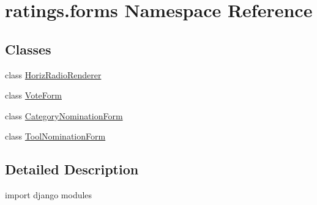 \hypertarget{namespaceratings_1_1forms}{\section{ratings.\-forms Namespace Reference}
\label{namespaceratings_1_1forms}
}
\subsection*{Classes}
\begin{DoxyCompactItemize}
\item 
class \hyperlink{classratings_1_1forms_1_1HorizRadioRenderer}{Horiz\-Radio\-Renderer}
\item 
class \hyperlink{classratings_1_1forms_1_1VoteForm}{Vote\-Form}
\item 
class \hyperlink{classratings_1_1forms_1_1CategoryNominationForm}{Category\-Nomination\-Form}
\item 
class \hyperlink{classratings_1_1forms_1_1ToolNominationForm}{Tool\-Nomination\-Form}
\end{DoxyCompactItemize}


\subsection{Detailed Description}
\begin{DoxyVerb}import django modules
\end{DoxyVerb}
 